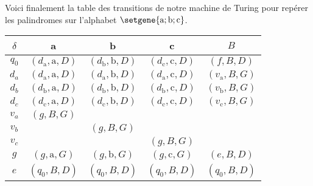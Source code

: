 Voici finalement la table des transitions de notre machine de Turing pour repérer les palindromes sur l'alphabet $\setgene{\text{a} ; \text{b} ; \text{c}}$.
\begin{center}
	\begin{tabular}{|c||c|c|c|c|}
		\hline
		$\delta$ 
			& a 
			& b 
			& c 
			& $B$ \\
		\hline
		\hline
		$q_0$
			& $(d_\text{a} , \text{a} , D)$
			& $(d_\text{b} , \text{b} , D)$
			& $(d_\text{c} , \text{c} , D)$
			& $(f          , B        , D)$ \\
		\hline
		\hline
		$d_a$
			& $(d_\text{a} , \text{a} , D)$
			& $(d_\text{a} , \text{b} , D)$
			& $(d_\text{a} , \text{c} , D)$
			& $(v_\text{a} , B        , G)$ \\
		\hline
		$d_b$
			& $(d_\text{b} , \text{a} , D)$
			& $(d_\text{b} , \text{b} , D)$
			& $(d_\text{b} , \text{c} , D)$
			& $(v_\text{b} , B        , G)$ \\
		\hline
		$d_c$
			& $(d_\text{c} , \text{a} , D)$
			& $(d_\text{c} , \text{b} , D)$
			& $(d_\text{c} , \text{c} , D)$
			& $(v_\text{c} , B        , G)$ \\
		\hline
		\hline
		$v_a$
			& $(g , B , G)$
			& 
			& 
			&  \\
		\hline
		$v_b$
			& 
			& $(g , B , G)$
			& 
			&  \\
		\hline
		$v_c$
			& 
			& 
			& $(g , B , G)$
			&  \\
		\hline
		\hline
		$g$
			& $(g , \text{a} , G)$
			& $(g , \text{b} , G)$
			& $(g , \text{c} , G)$
			& $(e , B        , D)$ \\
		\hline
		$e$
			& $(q_0 , B , D)$
			& $(q_0 , B , D)$
			& $(q_0 , B , D)$
			& $(q_0 , B , D)$ \\
		\hline
	\end{tabular}
\end{center}

